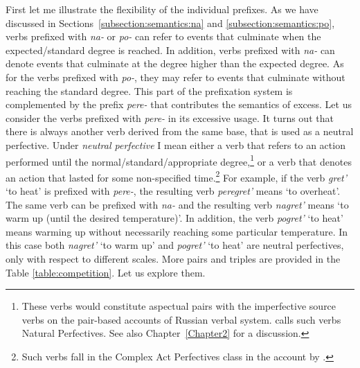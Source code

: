 First let me illustrate the flexibility of the individual prefixes. As we have discussed in Sections~\ref{subsection:semantics:na} and \ref{subsection:semantics:po}, verbs prefixed with \textit{na-} or \textit{po-} can refer to events that culminate when the expected/standard degree is reached. In addition, verbs prefixed with \textit{na-} can denote events that culminate at the degree higher than the expected degree. As for the verbs prefixed with \textit{po-}, they may refer to events that culminate without reaching the standard degree. This part of the prefixation system is complemented by the prefix \textit{pere-} that contributes the semantics of excess. Let us consider the verbs prefixed with \textit{pere-} in its excessive usage. It turns out that there is always another verb derived from the same base, that is used as a neutral perfective. Under \textit{neutral perfective} I mean either a verb that refers to an action performed until the normal/standard/appropriate degree,\footnote{These verbs would constitute aspectual pairs with the imperfective source verbs on the pair-based accounts of Russian verbal system. \citet{Janda:07a} calls such verbs Natural Perfectives. See also Chapter~\ref{Chapter2} for a discussion.} or a verb that denotes an action that lasted for some non-specified time.\footnote{Such verbs fall in the Complex Act Perfectives class in the account by \citet{Janda:07a}.} For example, if the verb \textit{gret'} `to heat' is prefixed with \textit{pere-}, the resulting verb \textit{peregret'} means `to overheat'. The same verb can be prefixed with \textit{na-} and the resulting verb \textit{nagret'} means `to warm up (until the desired temperature)'. In addition, the verb \textit{pogret'} `to heat' means warming up without necessarily reaching some particular temperature. In this case both \textit{nagret'} `to warm up'  and \textit{pogret'} `to heat' are neutral perfectives, only with respect to different scales. More pairs and triples are provided in the Table \ref{table:competition}. Let us explore them. 

